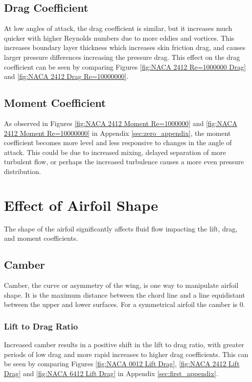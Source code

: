 \documentclass{article}
\begin{document}
\subsection{Drag Coefficient}

At low angles of attack, the drag coefficient is similar, but it increases much quicker with higher Reynolds numbers due to more eddies and vortices. This increases boundary layer thickness which increases skin friction drag, and causes larger pressure differences increasing the pressure drag. This effect on the drag coefficient can be seen by comparing Figures \ref{fig:NACA 2412 Re=1000000 Drag} and \ref{fig:NACA 2412 Drag Re=10000000}.

\subsection{Moment Coefficient}

As observed in Figures \ref{fig:NACA 2412 Moment Re=1000000} and \ref{fig:NACA 2412 Moment Re=10000000} in Appendix \ref{sec:zero_appendix}, the moment coefficient becomes more level and less responsive to changes in the angle of attack. This could be due to increased mixing, delayed separation of more turbulent flow, or perhaps the increased turbulence causes a more even pressure distribution.

\section{Effect of Airfoil Shape}
The shape of the airfoil significantly affects fluid flow impacting the lift, drag, and moment coefficients.
\subsection{Camber}
Camber, the curve or asymmetry of the wing, is one way to manipulate airfoil shape. It is the maximum distance between the chord line and a line equidistant between the upper and lower surfaces. For a symmetrical airfoil the camber is 0. 
\subsubsection{Lift to Drag Ratio}

Increased camber results in a positive shift in the lift to drag ratio, with greater periods of low drag and more rapid increases to higher drag coefficients. This can be seen by comparing Figures \ref{fig:NACA 0012 Lift Drag}, \ref{fig:NACA 2412 Lift Drag} and \ref{fig:NACA 6412 Lift Drag} in Appendix \ref{sec:first_appendix}.
\end{document}
